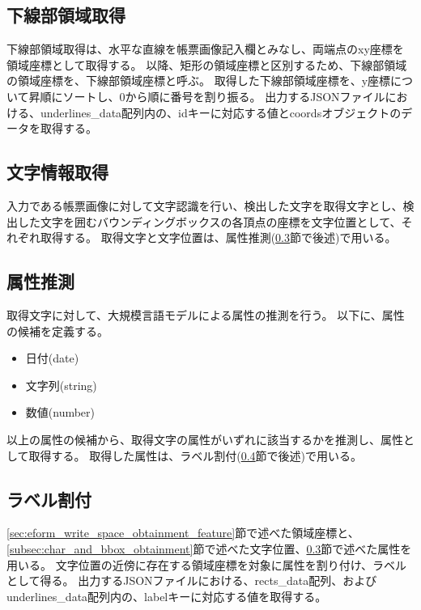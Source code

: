 \subsection{下線部領域取得}\label{subsec:underline_coords_obtainment}
下線部領域取得は、水平な直線を帳票画像記入欄とみなし、両端点のxy座標を領域座標として取得する。
以降、矩形の領域座標と区別するため、下線部領域の領域座標を、下線部領域座標と呼ぶ。
取得した下線部領域座標を、y座標について昇順にソートし、0から順に番号を割り振る。
出力するJSONファイルにおける、underlines\_data配列内の、idキーに対応する値とcoordsオブジェクトのデータを取得する。

\subsection{文字情報取得}\label{subsec:char_information_obtainment}
入力である帳票画像に対して文字認識を行い、検出した文字を取得文字とし、検出した文字を囲むバウンディングボックスの各頂点の座標を文字位置として、それぞれ取得する。
取得文字と文字位置は、属性推測(\ref{subsec:att_prediction}節で後述)で用いる。

\subsection{属性推測}\label{subsec:att_prediction}
取得文字に対して、大規模言語モデルによる属性の推測を行う。
以下に、属性の候補を定義する。

\begin{itemize}
    \item 日付(date)
    \item 文字列(string)
    \item 数値(number)
\end{itemize}

以上の属性の候補から、取得文字の属性がいずれに該当するかを推測し、属性として取得する。
取得した属性は、ラベル割付(\ref{subsec:label_link}節で後述)で用いる。

\subsection{ラベル割付}\label{subsec:label_link}
\ref{sec:eform_write_space_obtainment_feature}節で述べた領域座標と、\ref{subsec:char_and_bbox_obtainment}節で述べた文字位置、\ref{subsec:att_prediction}節で述べた属性を用いる。
文字位置の近傍に存在する領域座標を対象に属性を割り付け、ラベルとして得る。
出力するJSONファイルにおける、rects\_data配列、およびunderlines\_data配列内の、labelキーに対応する値を取得する。

